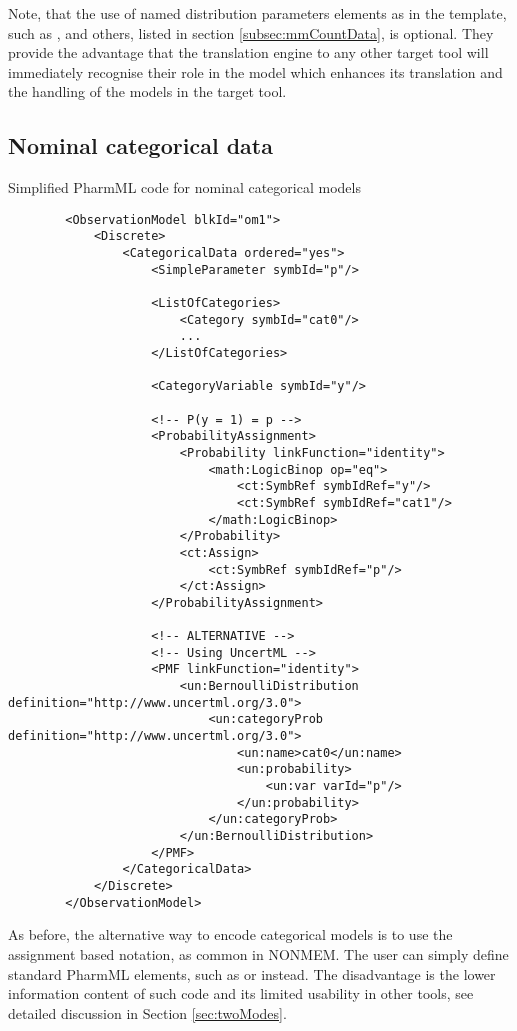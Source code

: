 Note, \marginpar{\HandCuffLeft} that the use of named distribution parameters elements as in the template, 
such as ,  and others, listed in section 
\ref{subsec:mmCountData}, is optional. 
They provide the advantage that the translation engine to any other target tool will immediately 
recognise their role in the model which enhances its translation and the handling of the models in the 
target tool.

\subsection{Nominal categorical data}
Simplified PharmML code for nominal categorical models
\lstset{language=XML}
\begin{lstlisting}
        <ObservationModel blkId="om1">
            <Discrete>
                <CategoricalData ordered="yes">
                    <SimpleParameter symbId="p"/>
                    
                    <ListOfCategories> 
                        <Category symbId="cat0"/>
                        ...
                    </ListOfCategories>
                    
                    <CategoryVariable symbId="y"/>
                    
                    <!-- P(y = 1) = p -->
                    <ProbabilityAssignment>
                        <Probability linkFunction="identity">
                            <math:LogicBinop op="eq">
                                <ct:SymbRef symbIdRef="y"/>
                                <ct:SymbRef symbIdRef="cat1"/>
                            </math:LogicBinop>
                        </Probability>
                        <ct:Assign>
                            <ct:SymbRef symbIdRef="p"/>
                        </ct:Assign>
                    </ProbabilityAssignment>
                    
                    <!-- ALTERNATIVE -->
                    <!-- Using UncertML -->
                    <PMF linkFunction="identity">
                        <un:BernoulliDistribution definition="http://www.uncertml.org/3.0">
                            <un:categoryProb definition="http://www.uncertml.org/3.0">
                                <un:name>cat0</un:name>
                                <un:probability>
                                    <un:var varId="p"/>
                                </un:probability>
                            </un:categoryProb>
                        </un:BernoulliDistribution>
                    </PMF>  
                </CategoricalData>
            </Discrete>
        </ObservationModel>
\end{lstlisting}
As before, the alternative way \marginpar{\HandCuffLeft} to encode categorical models is to use 
the assignment based notation, as common 
in NONMEM. The user can simply define standard PharmML elements, such as  or 
 instead. The disadvantage is the lower information content of such code and its limited
usability in other tools, see detailed discussion in Section \ref{sec:twoModes}.

